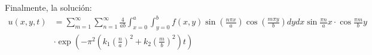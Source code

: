 \begin{solution}
Finalmente, la solución: 
\begin{align*}
    u(x,y,t) &=
    \sum_{m=1}^\infty\sum_{n=1}^\infty \frac{4}{ab} \int_{x=0}^{a} \int_{y=0}^{b} f(x, y) \sin \left(\frac{n \pi x}{a}\right) \cos \left(\frac{m \pi y}{b}\right) d y d x\sin\frac{\pi n}{a}x \cdot \cos \frac{\pi m}{b} y \\ &\cdot \exp\left(- \pi^2\left(k_1\left(\frac{ n}{a}\right)^2 +k_2\left(\frac{ m}{b}\right)^2\right)t\right)
\end{align*}
\end{solution}